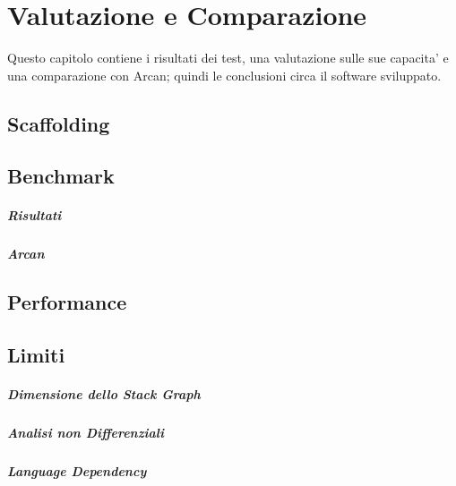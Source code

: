 \chapter{Valutazione e Comparazione}

Questo capitolo contiene i risultati dei test, una valutazione sulle sue capacita' e una comparazione con Arcan; quindi le conclusioni circa il software sviluppato.

\section{Scaffolding}

\section{Benchmark}

\paragraph{Risultati}

\paragraph{Arcan}

\section{Performance}

\section{Limiti}

\paragraph{Dimensione dello Stack Graph}

\paragraph{Analisi non Differenziali}

\paragraph{Language Dependency}
